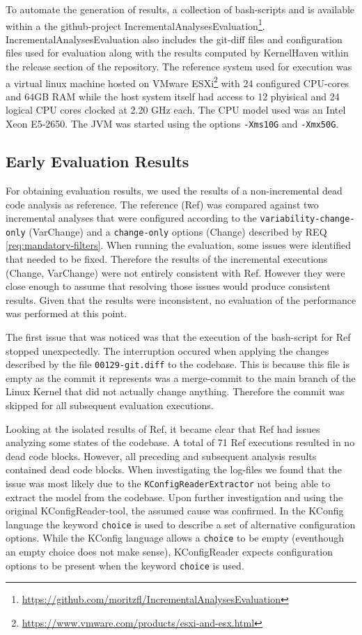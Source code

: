 \documentclass[a4paper]{article}
\begin{document}
To automate the generation of results, a collection of bash-scripts and is available within a the github-project Incremental\-Analyses\-Evaluation\footnote{\url{https://github.com/moritzfl/IncrementalAnalysesEvaluation}}. Incremental\-Analyses\-Evaluation also includes the git-diff files and  configuration files used for evaluation along with the results computed by KernelHaven within the release section of the repository. The reference system used for execution was a virtual linux machine hosted on VMware ESXi\footnote{\url{https://www.vmware.com/products/esxi-and-esx.html}} with 24 configured CPU-cores and 64GB RAM while the host system itself had access to 12 phyisical and 24 logical CPU cores clocked at 2.20 GHz each. The CPU model used was an Intel Xeon E5-2650. The JVM was started using the options \texttt{-Xms10G} and \texttt{-Xmx50G}.

\subsection{Early Evaluation Results} \label{early-evaluation-results}

For obtaining evaluation results, we used the results of a non-incremental dead code analysis as reference.  The reference (Ref) was compared against two incremental analyses that were configured according to the \texttt{variability-change-only} (VarChange) and a \texttt{change-only} options (Change) described by REQ \ref{req:mandatory-filters}.
When running the evaluation, some issues were identified that needed to be fixed. Therefore the results of the incremental executions (Change, VarChange) were not entirely consistent with Ref. However they were close enough to assume that resolving those issues would produce consistent results. Given that the results were inconsistent, no evaluation of the performance was performed at this point.

The first issue that was noticed was that the execution of the bash-script for Ref stopped unexpectedly. The interruption occured when applying the changes described by the file \texttt{00129-git.diff} to the codebase. This is because this file is empty as the commit it represents was a merge-commit to the main branch of the Linux Kernel that did not actually change anything. Therefore the commit was skipped for all subsequent evaluation executions.

Looking at the isolated results of Ref, it became clear that Ref had issues analyzing some states of the codebase. A total of 71 Ref executions resulted in no dead code blocks. However, all preceding and subsequent analysis results contained dead code blocks. When investigating the log-files we found that the issue was most likely due to the \texttt{KConfigReaderExtractor} not being able to extract the model from the codebase. Upon further investigation and using the original KConfigReader-tool, the assumed cause was confirmed. In the KConfig language the keyword \texttt{choice} is used to describe a set of alternative configuration options. While the KConfig language allows a \texttt{choice} to be empty (eventhough an empty choice does not make sense), KConfigReader expects configuration options to be present when the keyword \texttt{choice} is used. 
\end{document}
